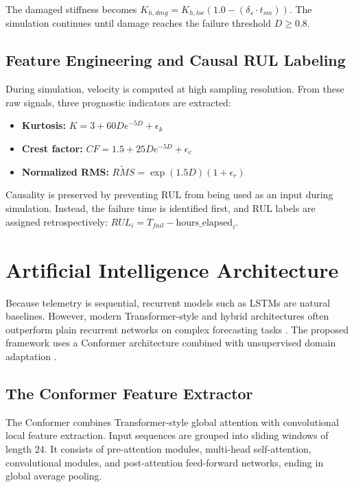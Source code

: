 \documentclass[journal,10pt,a4paper]{IEEEtran}
\begin{document}
The damaged stiffness becomes $K_{h,dmg} = K_{h,loc}(1.0 - (\delta_s \cdot t_{sm}))$. The simulation continues until damage reaches the failure threshold $D \ge 0.8$.

\subsection{Feature Engineering and Causal RUL Labeling}
During simulation, velocity is computed at high sampling resolution. From these raw signals, three prognostic indicators are extracted:

\begin{itemize}[leftmargin=1.5em]
    \item \textbf{Kurtosis:} $K = 3 + 60De^{-5D} + \epsilon_k$
    \item \textbf{Crest factor:} $CF = 1.5 + 25De^{-5D} + \epsilon_c$
    \item \textbf{Normalized RMS:} $\widetilde{RMS} = \exp(1.5D)(1 + \epsilon_r)$
\end{itemize}

Causality is preserved by preventing RUL from being used as an input during simulation. Instead, the failure time is identified first, and RUL labels are assigned retrospectively: $RUL_i = T_{fail} - \text{hours\_elapsed}_i$.

\section{Artificial Intelligence Architecture}
Because telemetry is sequential, recurrent models such as LSTMs are natural baselines. However, modern Transformer-style and hybrid architectures often outperform plain recurrent networks on complex forecasting tasks \cite{lstm_rul,nn_timeseries_pmc,transformer_rul_mdpi}. The proposed framework uses a Conformer architecture combined with unsupervised domain adaptation \cite{gulati2020conformer,uda_bearing_pmc}.

\subsection{The Conformer Feature Extractor}
The Conformer combines Transformer-style global attention with convolutional local feature extraction. Input sequences are grouped into sliding windows of length 24. It consists of pre-attention modules, multi-head self-attention, convolutional modules, and post-attention feed-forward networks, ending in global average pooling.
\end{document}
